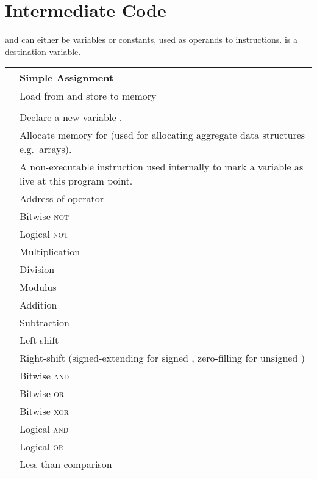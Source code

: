 \documentclass[../00-main.tex]{subfiles}
\begin{document}
\chapter{Intermediate Code}\label{app:intermediate code}

 and  can either be variables or constants, used as operands to instructions.
 is a destination variable.

\begin{xltabular}{\textwidth}{lX}
\toprule
{} & Simple Assignment \\
\midrule
{} & Load from and store to memory \\
 &  \\
\midrule
{} & Declare a new variable . \\
 & Allocate memory for  (used for allocating aggregate data structures e.g.\ arrays). \\
\midrule
{} & A non-executable instruction used internally to mark a variable as live at this program point. \\
\midrule
{} & Address-of operator \\
 & Bitwise \textsc{not} \\
 & Logical \textsc{not} \\
\midrule
{} & Multiplication \\
 & Division \\
 & Modulus \\
 & Addition \\
 & Subtraction \\
 & Left-shift \\
 & Right-shift (signed-extending for signed , zero-filling for unsigned ) \\
 & Bitwise \textsc{and} \\
 & Bitwise \textsc{or} \\
 & Bitwise \textsc{xor} \\
 & Logical \textsc{and} \\
 & Logical \textsc{or} \\
 & Less-than comparison \\

\end{xltabular}
\end{document}
